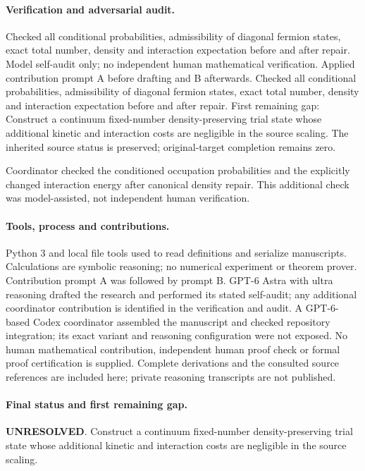 \documentclass[11pt]{article}
\begin{document}
\paragraph{Verification and adversarial audit.}
Checked all conditional probabilities, admissibility of diagonal fermion states, exact total number, density and interaction expectation before and after repair. Model self-audit only; no independent human mathematical verification. Applied contribution prompt A before drafting and B afterwards. Checked all conditional probabilities, admissibility of diagonal fermion states, exact total number, density and interaction expectation before and after repair. First remaining gap: Construct a continuum fixed-number density-preserving trial state whose additional kinetic and interaction costs are negligible in the source scaling. The inherited source status is preserved; original-target completion remains zero.

Coordinator checked the conditioned occupation probabilities and the explicitly changed interaction energy after canonical density repair. This additional check was model-assisted, not independent human verification.

\paragraph{Tools, process and contributions.}
Python 3 and local file tools used to read definitions and serialize manuscripts. Calculations are symbolic reasoning; no numerical experiment or theorem prover. Contribution prompt A was followed by prompt B. GPT-6 Astra with ultra reasoning drafted the research and performed its stated self-audit; any additional coordinator contribution is identified in the verification and audit. A GPT-6-based Codex coordinator assembled the manuscript and checked repository integration; its exact variant and reasoning configuration were not exposed. No human mathematical contribution, independent human proof check or formal proof certification is supplied. Complete derivations and the consulted source references are included here; private reasoning transcripts are not published.

\paragraph{Final status and first remaining gap.}
\textbf{UNRESOLVED}. Construct a continuum fixed-number density-preserving trial state whose additional kinetic and interaction costs are negligible in the source scaling.
\end{document}
